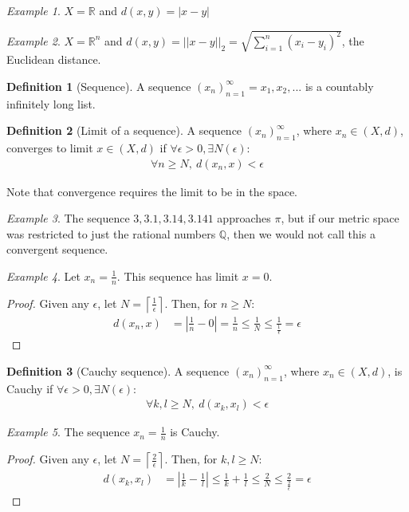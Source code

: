 \documentclass[11pt]{article}
\newcommand{\R}{\ensuremath{\mathbb R}}
\newcommand{\e}{\epsilon}
\newcommand{\E}{\exists}
\newcommand{\ceil}[1]{\ensuremath{\left\lceil#1\right\rceil}}
\theoremstyle{plain}
\theoremstyle{definition}
\newtheorem{defi}{Definition}[section]
\theoremstyle{remark}
\newtheorem{exm}{Example}[section]
\begin{document}
\begin{exm}
    $X = \R$ and $d(x,y) = |x - y|$
\end{exm}
\begin{exm}
    $X = \R^n$ and $d(x,y) = ||x - y||_2 = \sqrt{\sum_{i=1}^n (x_i - y_i)^2}$, the Euclidean distance.
\end{exm}

\begin{defi}[Sequence]
    A sequence $(x_n)_{n=1}^\infty = x_1, x_2,...$ is a countably infinitely long list.
\end{defi}

\begin{defi}[Limit of a sequence]
    A sequence $(x_n)_{n=1}^\infty$, where $x_n \in (X,d)$, converges to limit $x \in (X,d)$ if $\forall \e > 0, \E N(\e):$
    \begin{align*}
        \forall n \geq N, \ d(x_n, x) < \e
    \end{align*}
\end{defi}
Note that convergence requires the limit to be in the space.
\begin{exm}
    The sequence $3, 3.1, 3.14, 3.141$ approaches $\pi$, but if our metric space was restricted to just the rational numbers $\mathbb{Q}$, then we would not call this a convergent sequence.
\end{exm}
\begin{exm}
    Let $x_n = \frac{1}{n}$. This sequence has limit $x = 0$.
    \begin{proof}
    Given any $\e$, let $N = \ceil{\frac{1}{\e}}$. Then, for $n \geq N:$
    \begin{align*}
        d(x_n, x) &= \left|\frac{1}{n} - 0\right| = \frac{1}{n} \leq \frac{1}{N} \leq \frac{1}{\tfrac{1}{\e}} = \epsilon
    \end{align*}
    \end{proof}
\end{exm}
\begin{defi}[Cauchy sequence]
    A sequence $(x_n)_{n=1}^\infty$, where $x_n \in (X,d)$, is Cauchy if $\forall \e > 0, \E N(\e):$
    \begin{align*}
        \forall k,l \geq N, \ d(x_k, x_l) < \e
    \end{align*}
\end{defi}
\begin{exm}
    The sequence $x_n = \frac{1}{n}$ is Cauchy. 
    \begin{proof}
    Given any $\e$, let $N = \ceil{\frac{2}{\e}}$. Then, for $k,l \geq N:$
    \begin{align*}
        d(x_k, x_l) &= \left|\frac{1}{k} - \frac{1}{l}\right| \leq \frac{1}{k} + \frac{1}{l} \leq \frac{2}{N} \leq \frac{2}{\tfrac{2}{\e}} = \epsilon
    \end{align*}
    \end{proof}
\end{exm}
\end{document}
